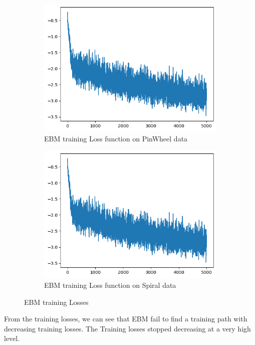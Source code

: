 \documentclass[11pt]{article}
\begin{document}
\begin{figure}[H]
\begin{subfigure}{0.45\textwidth}
			\centering
			\includegraphics[width=\textwidth]{EBM_Pin_loss.png}
			\caption{EBM training Loss function on PinWheel data}
			\label{fig:EBMPinLoss}
		\end{subfigure}
		\hfill
		\begin{subfigure}{0.45\textwidth}
			\centering
			\includegraphics[width=\textwidth]{EBM_Pin_loss.png}
			\caption{EBM training Loss function on Spiral data}
			\label{fig:EBMSpinLoss}
		\end{subfigure}
		
		\caption{EBM training Losses}
		\label{EBMTLoss}
	\end{figure}
	From the training losses, we can see that EBM fail to find a training path with decreasing training losses. The Training losses stopped decreasing at a very high level. 
\end{document}
